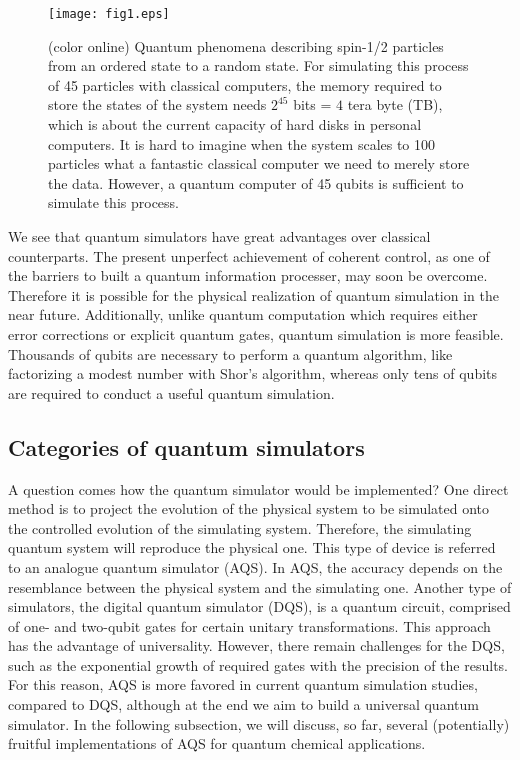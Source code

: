 \documentclass[8.5pt,twoside,twocolumn]{article}
\begin{document}
\begin{figure}[htb]
\begin{center}
\texttt{[image: fig1.eps]}
\end{center}
\caption{(color online) Quantum phenomena describing spin-1/2 particles
from an ordered state to a random state.
For simulating this process of 45 particles with classical computers,
the memory required to store the states of the system needs
$2^{45}$ bits = $4$ tera byte (TB), which is about the current
capacity of hard disks in personal computers.
It is hard to imagine when the system scales to 100 particles
what a fantastic classical computer we need to merely store the data.
However, a quantum computer of 45 qubits is sufficient to
simulate this process. }\label{fig1}
\end{figure}

We see that quantum simulators have great advantages
over classical counterparts.
The present unperfect achievement of coherent control,
as one of the barriers to built a quantum information processer,
may soon be overcome.\cite{Coherent_control}
Therefore it is possible for the physical realization of quantum
simulation in the near future.
Additionally, unlike quantum computation which requires either
error corrections or explicit quantum gates,
quantum simulation is more feasible.
Thousands of qubits are necessary to perform a quantum algorithm,
like factorizing a modest number with Shor's algorithm,
whereas only tens of qubits are required to conduct a
useful quantum simulation.\cite{Lloyds,Alan_first,Qubits}

\subsection{Categories of quantum simulators}\label{aa}

A question comes how the quantum simulator would be implemented?
One direct method is to project the evolution of the physical system
to be simulated onto the controlled evolution of the simulating system.
Therefore, the simulating quantum system
will reproduce the physical one.
This type of device is referred
to an analogue quantum simulator (AQS).\cite{Qubits,AQS_1,AQS_2,AQS_3}
In AQS, the accuracy
depends on the resemblance between the physical system
and the simulating one. Another type of simulators,
the digital quantum simulator (DQS), is a quantum circuit,
comprised of one- and two-qubit gates
for certain unitary transformations.\cite{Lloyds,DQS_1,DQS_2}
This approach has the advantage of universality.
However, there remain challenges for the DQS,
such as the exponential growth of required gates
with the precision of the results.\cite{Quantum_simulator}
For this reason, AQS is more favored in current
quantum simulation studies,
compared to DQS, although at the end
we aim to build a universal quantum simulator.
In the following subsection, we will discuss, so far,
several (potentially) fruitful implementations of AQS
for quantum chemical applications.
\end{document}
